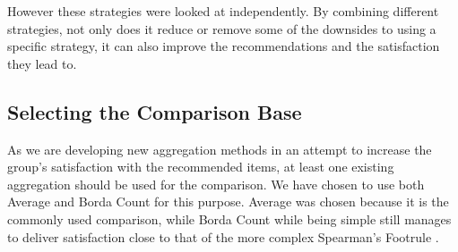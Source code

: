 However these strategies were looked at independently. By combining different strategies, not only does it reduce or remove some of the downsides to using a specific strategy, it can also improve the recommendations and the satisfaction they lead to.

\subsection{Selecting the Comparison Base}
As we are developing new aggregation methods in an attempt to increase the group’s satisfaction with the recommended items, at least one existing aggregation should be used for the comparison. We have chosen to use both Average and Borda Count for this purpose. Average was chosen because it is the commonly used comparison, while Borda Count while being simple still manages to deliver satisfaction close to that of the more complex Spearman’s Footrule \cite{baltrunas}.